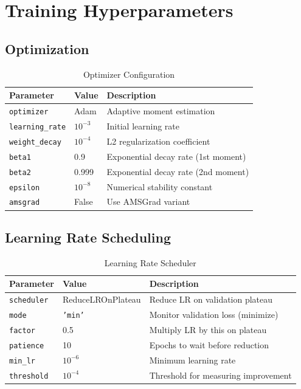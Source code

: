\section{Training Hyperparameters}

\subsection{Optimization}

\begin{table}[H]
\centering
\begin{tabular}{llp{7cm}}
\toprule
\textbf{Parameter} & \textbf{Value} & \textbf{Description} \\
\midrule
\texttt{optimizer} & Adam & Adaptive moment estimation \\
\texttt{learning\_rate} & $10^{-3}$ & Initial learning rate \\
\texttt{weight\_decay} & $10^{-4}$ & L2 regularization coefficient \\
\texttt{beta1} & 0.9 & Exponential decay rate (1st moment) \\
\texttt{beta2} & 0.999 & Exponential decay rate (2nd moment) \\
\texttt{epsilon} & $10^{-8}$ & Numerical stability constant \\
\texttt{amsgrad} & False & Use AMSGrad variant \\
\bottomrule
\end{tabular}
\caption{Optimizer Configuration}
\end{table}

\subsection{Learning Rate Scheduling}

\begin{table}[H]
\centering
\begin{tabular}{llp{7cm}}
\toprule
\textbf{Parameter} & \textbf{Value} & \textbf{Description} \\
\midrule
\texttt{scheduler} & ReduceLROnPlateau & Reduce LR on validation plateau \\
\texttt{mode} & \texttt{'min'} & Monitor validation loss (minimize) \\
\texttt{factor} & 0.5 & Multiply LR by this on plateau \\
\texttt{patience} & 10 & Epochs to wait before reduction \\
\texttt{min\_lr} & $10^{-6}$ & Minimum learning rate \\
\texttt{threshold} & $10^{-4}$ & Threshold for measuring improvement \\
\bottomrule
\end{tabular}
\caption{Learning Rate Scheduler}
\end{table}

